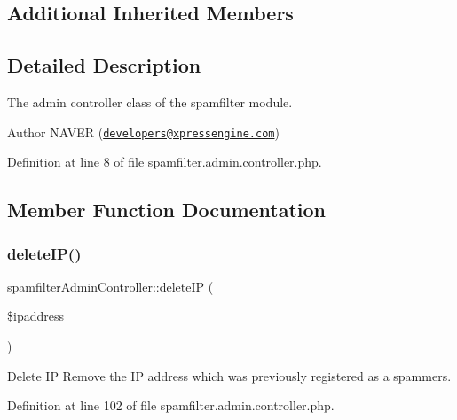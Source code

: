 \subsection*{Additional Inherited Members}


\subsection{Detailed Description}
The admin controller class of the spamfilter module. 

\begin{DoxyAuthor}{Author}
N\+A\+V\+ER (\href{mailto:developers@xpressengine.com}{\tt developers@xpressengine.\+com}) 
\end{DoxyAuthor}


Definition at line 8 of file spamfilter.\+admin.\+controller.\+php.



\subsection{Member Function Documentation}
\mbox{\label{classspamfilterAdminController_a19442650a60b49972b158d12a978fcf9}} 
\subsubsection{\texorpdfstring{delete\+I\+P()}{deleteIP()}}
{\footnotesize\ttfamily spamfilter\+Admin\+Controller\+::delete\+IP (\begin{DoxyParamCaption}\item[{}]{\$ipaddress }\end{DoxyParamCaption})}



Delete IP Remove the IP address which was previously registered as a spammers. 



Definition at line 102 of file spamfilter.\+admin.\+controller.\+php.

\mbox{\label{classspamfilterAdminController_a57a1cc55622637f806f416da03952ccc}} 
